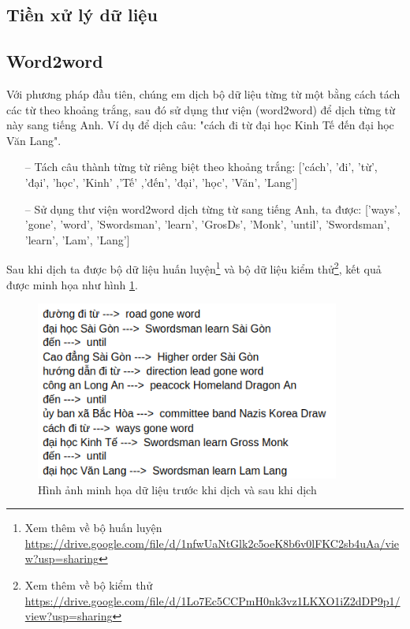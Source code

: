 \subsection{Tiền xử lý dữ liệu}

\subsection{Word2word}

Với phương pháp đầu tiên, chúng em dịch bộ dữ liệu từng từ một bằng cách tách các từ theo khoảng trắng, sau đó sử dụng thư viện (word2word) để dịch từng từ này sang tiếng Anh. Ví dụ để dịch câu: "cách đi từ đại học Kinh Tế đến đại học Văn Lang".
\begin{itemize}
    \item[--] Tách câu thành từng từ riêng biệt theo khoảng trắng: ['cách', 'đi', 'từ', 'đại', 'học', 'Kinh' ,'Tế' ,'đến', 'đại', 'học', 'Văn', 'Lang']
    \item[--] Sử dụng thư viện word2word dịch từng từ sang tiếng Anh, ta được: ['ways', 'gone', 'word', 'Swordsman', 'learn', 'GrosDs', 'Monk', 'until', 'Swordsman', 'learn', 'Lam', 'Lang']
\end{itemize}

Sau khi dịch ta được bộ dữ liệu huấn luyện\footnote{Xem thêm về bộ huấn luyện \url{https://drive.google.com/file/d/1nfwUaNtGlk2c5oeK8b6v0lFKC2sb4uAa/view?usp=sharing}} và bộ dữ liệu kiểm thử\footnote{Xem thêm về bộ kiểm thử \url{https://drive.google.com/file/d/1Lo7Ec5CCPmH0nk3vz1LKXO1iZ2dDP9p1/view?usp=sharing}}, kết quả được minh họa như hình \ref{fig:trainingdata_dichtungtu}.
\begin{figure}[htp]
    \centering
    \includegraphics[width=10cm]{images/trainingdata_dichtungtu.png}
    \caption{Hình ảnh minh họa dữ liệu trước khi dịch và sau khi dịch}
    \label{fig:trainingdata_dichtungtu}
\end{figure}



